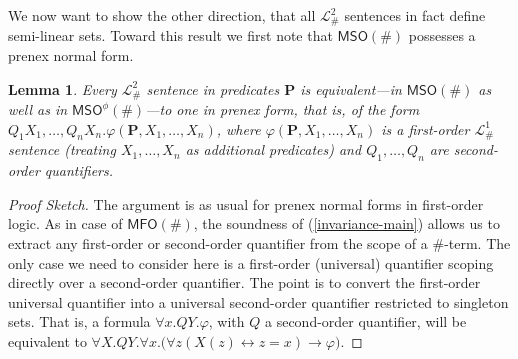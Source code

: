\documentclass[12pt,oneside,reqno]{amsart}
\newtheorem{lemma}{Lemma}
\theoremstyle{definition}
\begin{document}
We now want to show the other direction, that all $\mathcal{L}_\#^2$ sentences in fact define semi-linear sets. Toward this result we first note that $\mathsf{MSO}(\#)$ possesses a prenex normal form. 
\begin{lemma} \label{lemma:prenex}
Every $\mathcal{L}_\#^2$ sentence in predicates $\mathbf{P}$ is equivalent---in $\mathsf{MSO}(\#)$ as well as in $\mathsf{MSO}^\phi(\#)$---to one in prenex form, that is, of the form $Q_1X_1,\dots,Q_nX_n. \varphi(\mathbf{P},X_1,\dots,X_n)$, where $\varphi(\mathbf{P},X_1,\dots,X_n)$ is a first-order $\mathcal{L}_\#^1$ sentence (treating $X_1,\dots,X_n$ as additional predicates) and $Q_1,\dots,Q_n$ are second-order quantifiers.
\end{lemma}
\begin{proof}[Proof Sketch] The argument is as usual for prenex normal forms in first-order logic. As in case of $\mathsf{MFO}(\#)$, the soundness of (\ref{invariance-main}) allows us to extract any first-order or second-order quantifier from the scope of a $\#$-term. The only case we need to consider here is a first-order (universal) quantifier scoping directly over a second-order quantifier. The point is to convert the first-order universal quantifier into a universal second-order quantifier restricted to singleton sets. That is, a formula $\forall x. QY. \varphi$, with $Q$ a second-order quantifier, will be equivalent to $\forall X. QY. \forall x. \big(\forall z(X(z) \leftrightarrow z=x) \rightarrow \varphi  \big)$.
\end{proof}
\end{document}
